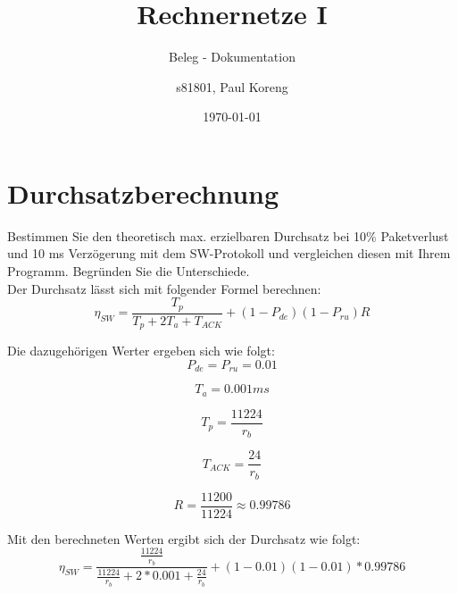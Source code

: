 \documentclass[a4paper,12pt,titlepage]{scrartcl}
\title{Rechnernetze I}
\subtitle{Beleg - Dokumentation}
\author{s81801, Paul Koreng}
\date{\today}
\begin{document}
    {
        \centering
        \maketitle
    }
    \newpage
    \tableofcontents
    \newpage
    \section{Durchsatzberechnung}
        Bestimmen Sie den theoretisch max. erzielbaren Durchsatz bei 10\% Paketverlust und 10 ms Verzögerung mit dem SW-Protokoll und vergleichen diesen mit Ihrem Programm. Begründen Sie die Unterschiede.\\

        Der Durchsatz lässt sich mit folgender Formel berechnen:
        \begin{equation*}
            \eta_{SW} = \frac{T_{p}}{T_{p} + 2T_{a} + T_{ACK}} + (1 - P_{de})(1-P_{ru})R
        \end{equation*}

        Die dazugehörigen Werter ergeben sich wie folgt:
        \begin{equation*}
            P_{de} = P_{ru} = 0.01
        \end{equation*}

        \begin{equation*}
            T_{a} = 0.001ms
        \end{equation*}

        \begin{equation*}
            T_{p} = \frac{11224}{r_{b}}
        \end{equation*}

        \begin{equation*}
            T_{ACK} = \frac{24}{r_{b}}
        \end{equation*}
        
        \begin{equation*}
            R = \frac{11200}{11224} \approx 0.99786
        \end{equation*}

        Mit den berechneten Werten ergibt sich der Durchsatz wie folgt:
        \begin{equation*}
            \eta_{SW} = \frac{\frac{11224}{r_{b}}}{\frac{11224}{r_{b}} + 2 * 0.001 + \frac{24}{r_{b}}} + (1 - 0.01)(1-0.01)*0.99786
        \end{equation*}
\end{document}
